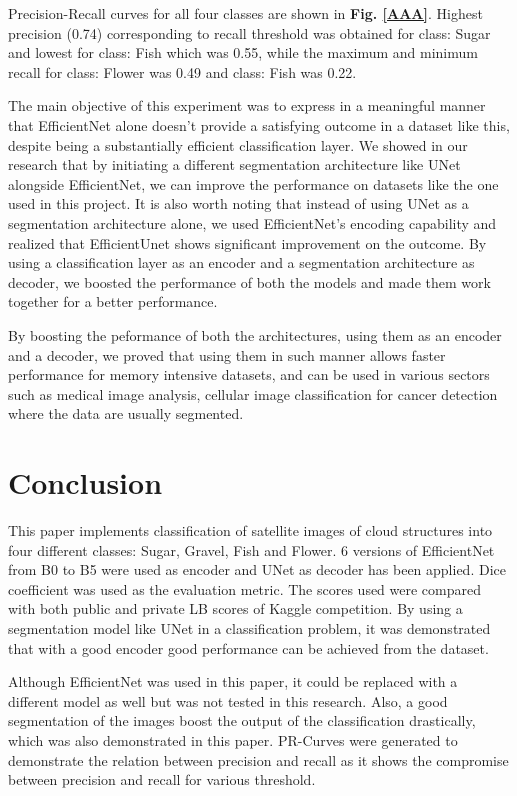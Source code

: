 \documentclass[conference]{IEEEtran}
\begin{document}
Precision-Recall curves for all four classes are shown in \textbf{Fig. \ref{AAA}}. Highest precision (0.74) corresponding to recall threshold was obtained for class: Sugar and lowest for class: Fish which was 0.55, while the maximum and minimum recall for class: Flower was 0.49 and class: Fish was 0.22.

The main objective of this experiment was to express in a meaningful manner that EfficientNet alone doesn't provide a satisfying outcome in a dataset like this, despite being a substantially efficient classification layer. We showed in our research that by initiating a different segmentation architecture like UNet alongside EfficientNet, we can improve the performance on datasets like the one used in this project. It is also worth noting that instead of using UNet as a segmentation architecture alone, we used EfficientNet's encoding capability and realized that EfficientUnet shows significant improvement on the outcome. By using a classification layer as an encoder and a segmentation architecture as decoder, we boosted the performance of both the models and made them work together for a better performance.

By boosting the peformance of both the architectures, using them as an encoder and a decoder, we proved that using them in such manner allows faster performance for memory intensive datasets, and can be used in various sectors such as medical image analysis, cellular image classification for cancer detection where the data are usually segmented.


\section {Conclusion} 
This paper implements classification of satellite images of cloud structures into four different classes: Sugar, Gravel, Fish and Flower. 6 versions of EfficientNet from B0 to B5 were used as encoder and UNet as decoder has been applied. Dice coefficient was used as the evaluation metric. The scores used were compared with both public and private LB scores of Kaggle competition. By using a segmentation model like UNet in a classification problem, it was demonstrated that with a good encoder good performance can be achieved from the dataset. 

Although EfficientNet was used in this paper, it could be replaced with a different model as well but was not tested in this research. Also, a good segmentation of the images boost the output of the classification drastically, which was also demonstrated in this paper. PR-Curves were generated to demonstrate the relation between precision and recall as it shows the compromise between precision and recall for various threshold. 
\end{document}
